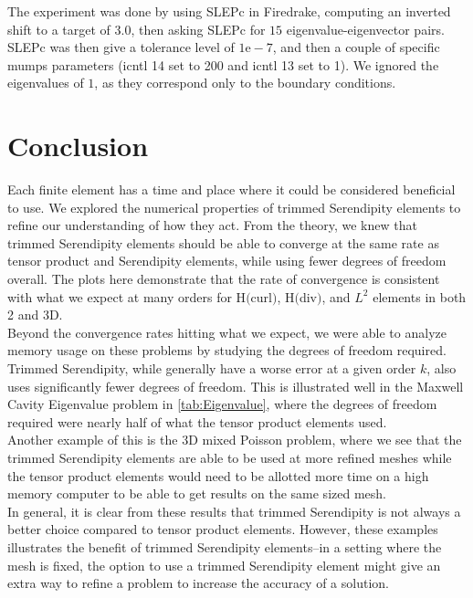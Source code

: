 \documentclass[manuscript,screen]{acmart}
\begin{document}
\noindent The experiment was done by using SLEPc in Firedrake, computing an inverted shift to a target of $3.0$, then asking SLEPc for $15$ eigenvalue-eigenvector pairs.  SLEPc was then give a tolerance level of $1\text{e}-7$, and then a couple of specific mumps parameters (icntl 14 set to 200 and icntl 13 set to 1).  We ignored the eigenvalues of $1$, as they correspond only to the boundary conditions. 

\section{Conclusion}

\noindent Each finite element has a time and place where it could be considered beneficial to use.  We explored the numerical properties of trimmed Serendipity elements to refine our understanding of how they act.  From the theory, we knew that trimmed Serendipity elements should be able to converge at the same rate as tensor product and Serendipity elements, while using fewer degrees of freedom overall.  The plots here demonstrate that the rate of convergence is consistent with what we expect at many orders for H$($curl$)$, H$($div$)$, and $L^2$ elements in both 2 and 3D.\\

\noindent Beyond the convergence rates hitting what we expect, we were able to analyze memory usage on these problems by studying the degrees of freedom required.  Trimmed Serendipity, while generally have a worse error at a given order $k$, also uses significantly fewer degrees of freedom.  This is illustrated well in the Maxwell Cavity Eigenvalue problem in \ref{tab:Eigenvalue}, where the degrees of freedom required were nearly half of what the tensor product elements used.  \\

\noindent Another example of this is the 3D mixed Poisson problem, where we see that the trimmed Serendipity elements are able to be used at more refined meshes while the tensor product elements would need to be allotted more time on a high memory computer to be able to get results on the same sized mesh.  \\

\noindent In general, it is clear from these results that trimmed Serendipity is not always a better choice compared to tensor product elements.  However, these examples illustrates the benefit of trimmed Serendipity elements--in a setting where the mesh is fixed, the option to use a trimmed Serendipity element might give an extra way to refine a problem to increase the accuracy of a solution.


\end{document}
